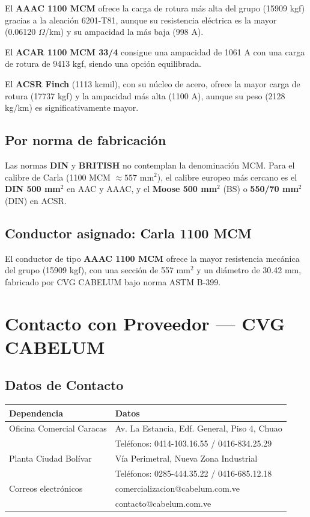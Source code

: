 \documentclass[12pt,a4paper]{article}
\begin{document}
El \textbf{AAAC 1100 MCM} ofrece la carga de rotura más alta del grupo
(15909 kgf) gracias a la aleación 6201-T81, aunque su resistencia eléctrica
es la mayor (0.06120 $\Omega$/km) y su ampacidad la más baja (998 A).

El \textbf{ACAR 1100 MCM 33/4} consigue una ampacidad de 1061 A con una
carga de rotura de 9413 kgf, siendo una opción equilibrada.

El \textbf{ACSR Finch} (1113 kcmil), con su núcleo de acero, ofrece la mayor
carga de rotura (17737 kgf) y la ampacidad más alta (1100 A), aunque su peso
(2128 kg/km) es significativamente mayor.

\subsection{Por norma de fabricación}

Las normas \textbf{DIN} y \textbf{BRITISH} no contemplan la denominación MCM.
Para el calibre de Carla (1100 MCM $\approx 557\text{ mm}^2$), el calibre
europeo más cercano es el \textbf{DIN 500 mm$^2$} en AAC y AAAC, y el
\textbf{Moose 500 mm$^2$} (BS) o \textbf{550/70 mm$^2$} (DIN) en ACSR.

\subsection{Conductor asignado: Carla 1100 MCM}

El conductor de tipo \textbf{AAAC 1100 MCM} ofrece la mayor resistencia
mecánica del grupo (15909 kgf), con una sección de 557 mm$^2$ y un diámetro
de 30.42 mm, fabricado por CVG CABELUM bajo norma ASTM B-399.

\section{Contacto con Proveedor --- CVG CABELUM}

\subsection{Datos de Contacto}

\begin{center}
\begin{tabular}{ll}
\toprule
\textbf{Dependencia} & \textbf{Datos} \\
\midrule
Oficina Comercial Caracas & Av. La Estancia, Edf. General, Piso 4, Chuao \\
& Teléfonos: 0414-103.16.55 / 0416-834.25.29 \\
\midrule
Planta Ciudad Bolívar & Vía Perimetral, Nueva Zona Industrial \\
& Teléfonos: 0285-444.35.22 / 0416-685.12.18 \\
\midrule
Correos electrónicos & comercializacion@cabelum.com.ve \\
& contacto@cabelum.com.ve \\
\bottomrule
\end{tabular}
\end{center}
\end{document}

